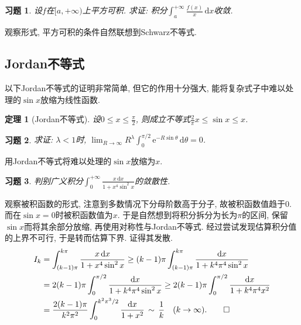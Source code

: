 \documentclass[11pt,a4paper]{ctexart}
\makeatletter
\theoremstyle{thmseries} %
\newtheorem{thm}{定理}[section]
\theoremstyle{exerseries}
\newtheorem{exer}{习题}[section]
\renewenvironment{proof}[1][\proofname]{\par
  \pushQED{\qed}%
  \normalfont \topsep6\p@\@plus6\p@\relax
  \trivlist
  \item[\hskip\labelsep
        \itshape
    #1\@addpunct{}]\ignorespaces
}{%
  \popQED\endtrivlist\@endpefalse
}
\newenvironment{sol}{\begin{proof}[\bfseries\upshape 解\quad]}{\end{proof}}
\newenvironment{pf}{\begin{proof}[\bfseries\upshape 证\quad]}{\end{proof}}
\renewcommand{\d}{\mathrm{d}}
\newcommand{\e}{\mathrm{e}}
\makeatother
\begin{document}
\begin{exer}
	设$f$在$[a,+\infty)$上平方可积. 求证: 积分$\int_{a}^{+\infty}\frac{f(x)}{x}\,\d x$收敛. 
\end{exer}
\begin{pf}
	观察形式, 平方可积的条件自然联想到Schwarz不等式. 
\end{pf}


\subsection{Jordan不等式}
以下Jordan不等式的证明非常简单, 但它的作用十分强大, 能将复杂式子中难以处理的$\sin x$放缩为线性函数. 
\begin{thm}[Jordan不等式]
	设$0\leq x\leq\frac{\pi}{2}$, 则成立不等式$\frac{2}{\pi}x\leq\sin x\leq x$. 
\end{thm}

\begin{exer}
	求证: $\lambda<1$时, $\lim_{R\to\infty}R^\lambda\int_{0}^{\pi/2}\e^{-R\sin\theta}\,\d\theta=0$. 
\end{exer}
\begin{pf}
	用Jordan不等式将难以处理的$\sin x$放缩为$x$. 
\end{pf}


\begin{exer}
	判别广义积分$\int_{0}^{+\infty}\frac{x\,\d x}{1+x^4\sin^2x}$的敛散性. 
\end{exer}
\begin{sol}
	观察被积函数的形式, 注意到多数情况下分母阶数高于分子, 故被积函数值趋于$0$. 而在$\sin x=0$时被积函数值为$x$. 于是自然想到将积分拆分为长为$\pi$的区间, 保留$\sin x$而将其余部分放缩, 再使用对称性与Jordan不等式. 经过尝试发现估算积分值的上界不可行, 于是转而估算下界. 证得其发散. 
	\begin{align*}
		I_k&=\int_{(k-1)\pi}^{k\pi}\frac{x\,\d x}{1+x^4\sin^2x}\geq(k-1)\pi\int_{(k-1)\pi}^{k\pi}\frac{\d x}{1+k^4\pi^4\sin^2x}\\
		&=2(k-1)\pi\int_{0}^{\pi/2}\frac{\d x}{1+k^4\pi^4\sin^2x}\geq2(k-1)\pi\int_{0}^{\pi/2}\frac{\d x}{1+k^4\pi^4x^2}\\
		&=\frac{2(k-1)\pi}{k^2\pi^2}\int_{0}^{k^2\pi^3/2}\frac{\d x}{1+x^2}\,\sim\,\frac{1}{k}\quad(k\to\infty).\qedhere
	\end{align*}
\end{sol}
\end{document}

